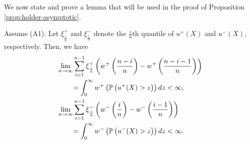 We now state and prove a lemma that will be used in the proof of Proposition \ref{prop:holder-asymptotic}.
\begin{lemma}
\label{prop:holder-quantile}
Assume (A1). Let $\xi^+_{\frac{i}{n}}$ and $\xi^-_{\frac{i}{n}}$ denote the $\frac{i}{n}$th quantile of $u^+(X)$ and $u^-(X)$, respectively. Then, we have  
\begin{align}
&\lim_{n \rightarrow \infty} \sum_{i=1}^{n-1} \xi^+_{\frac{i}{n}} \left(w^+\left(\frac{n-i}{n}\right)- w^+\left(\frac{n-i-1}{n}\right) \right)  \nonumber\\
&\qquad= \int_0^{\infty} w^+\left(\mathbb{P}\left( u^+(X)>z \right)\right) dz < \infty,\label{eq:simple-estimation}\\
&\lim_{n \rightarrow \infty} \sum_{i=1}^{n-1} \xi^-_{\frac{i}{n}} \left(w^-\left(\frac{i}{n}\right)- w^-\left(\frac{i-1}{n}\right) \right) \nonumber\\
&\qquad= \int_0^{\infty} w^-\left(\mathbb{P}\left( u^-(X)>z \right)\right) dz < \infty.\label{eq:simple-estimation2}
\end{align}
\end{lemma}


